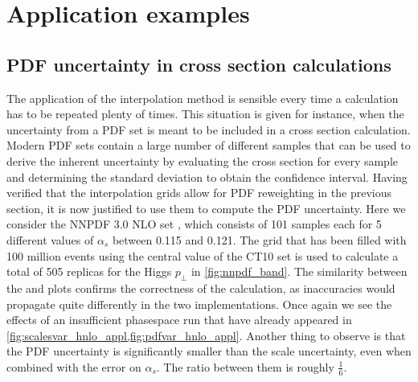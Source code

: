 
\chapter{Application examples}
\label{ch:examples}
%
\section{PDF uncertainty in cross section calculations}
The application of the interpolation method is sensible every time a calculation has to be repeated plenty of times.
This situation is given for instance, when the uncertainty from a PDF set is meant to be included in a cross section calculation.
Modern PDF sets contain a large number of different samples that can be used to derive the inherent uncertainty by evaluating the cross section for every sample and determining the standard deviation to obtain the confidence interval.
Having verified that the interpolation grids allow for PDF reweighting in the previous section, it is now justified to use them to compute the PDF uncertainty.
Here we consider the NNPDF 3.0 NLO set \cite{nnpdf30}, which consists of \num{101} samples each for \num{5} different values of $\alpha_s$ between \num{0.115} and \num{0.121}.
The grid that has been filled with 100 million events using the central value of the CT10 set is used to calculate a total of 505 replicas for the Higgs $p_\perp$ in \cref{fig:nnpdf_band}.
The similarity between the \appl{} and \fnlo{} plots confirms the correctness of the calculation, as inaccuracies would propagate quite differently in the two implementations.
Once again we see the effects of an insufficient phasespace run that have already appeared in \cref{fig:scalesvar_hnlo_appl,fig:pdfvar_hnlo_appl}.
Another thing to observe is that the PDF uncertainty is significantly smaller than the scale uncertainty, even when combined with the error on $\alpha_s$.
The ratio between them is roughly $\frac{1}{6}$.
%
